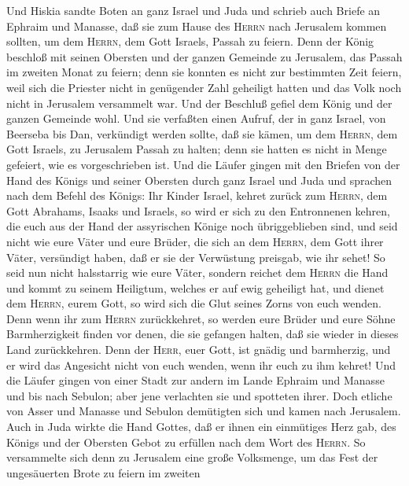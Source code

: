  Und Hiskia sandte Boten an ganz Israel und Juda und
schrieb auch Briefe an Ephraim und Manasse, daß sie zum Hause des
\textsc{Herrn} nach Jerusalem kommen sollten, um dem \textsc{Herrn}, dem
Gott Israels, Passah zu feiern.  Denn der König beschloß
mit seinen Obersten und der ganzen Gemeinde zu Jerusalem, das Passah im
zweiten Monat zu feiern;  denn sie konnten es nicht zur
bestimmten Zeit feiern, weil sich die Priester nicht in genügender Zahl
geheiligt hatten und das Volk noch nicht in Jerusalem versammelt war.
 Und der Beschluß gefiel dem König und der ganzen Gemeinde
wohl.  Und sie verfaßten einen Aufruf, der in ganz Israel,
von Beerseba bis Dan, verkündigt werden sollte, daß sie kämen, um dem
\textsc{Herrn}, dem Gott Israels, zu Jerusalem Passah zu halten; denn
sie hatten es nicht in Menge gefeiert, wie es vorgeschrieben ist.
 Und die Läufer gingen mit den Briefen von der Hand des
Königs und seiner Obersten durch ganz Israel und Juda und sprachen nach
dem Befehl des Königs: Ihr Kinder Israel, kehret zurück zum
\textsc{Herrn}, dem Gott Abrahams, Isaaks und Israels, so wird er sich
zu den Entronnenen kehren, die euch aus der Hand der assyrischen Könige
noch übriggeblieben sind,  und seid nicht wie eure Väter
und eure Brüder, die sich an dem \textsc{Herrn}, dem Gott ihrer Väter,
versündigt haben, daß er sie der Verwüstung preisgab, wie ihr sehet!
 So seid nun nicht halsstarrig wie eure Väter, sondern
reichet dem \textsc{Herrn} die Hand und kommt zu seinem Heiligtum,
welches er auf ewig geheiligt hat, und dienet dem \textsc{Herrn}, eurem
Gott, so wird sich die Glut seines Zorns von euch wenden. 
Denn wenn ihr zum \textsc{Herrn} zurückkehret, so werden eure Brüder und
eure Söhne Barmherzigkeit finden vor denen, die sie gefangen halten, daß
sie wieder in dieses Land zurückkehren. Denn der \textsc{Herr}, euer
Gott, ist gnädig und barmherzig, und er wird das Angesicht nicht von
euch wenden, wenn ihr euch zu ihm kehret!  Und die Läufer
gingen von einer Stadt zur andern im Lande Ephraim und Manasse und bis
nach Sebulon; aber jene verlachten sie und spotteten ihrer.
 Doch etliche von Asser und Manasse und Sebulon
demütigten sich und kamen nach Jerusalem.  Auch in Juda
wirkte die Hand Gottes, daß er ihnen ein einmütiges Herz gab, des Königs
und der Obersten Gebot zu erfüllen nach dem Wort des \textsc{Herrn}.
 So versammelte sich denn zu Jerusalem eine große
Volksmenge, um das Fest der ungesäuerten Brote zu feiern im zweiten
